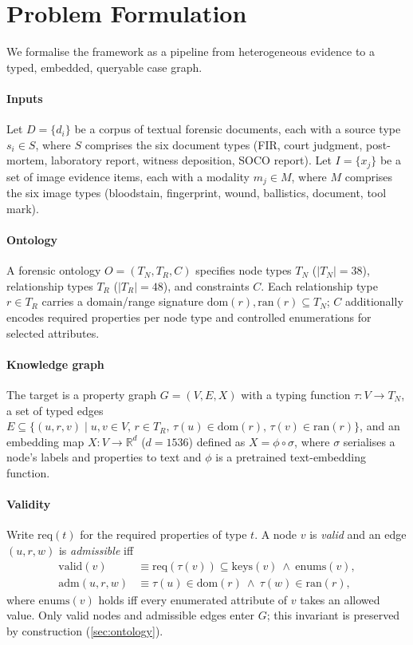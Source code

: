 \documentclass[conference]{IEEEtran}
\begin{document}
\section{Problem Formulation}
\label{sec:problem}

We formalise the framework as a pipeline from heterogeneous evidence to a typed,
embedded, queryable case graph.

\paragraph*{Inputs} Let $D=\{d_i\}$ be a corpus of textual forensic documents,
each with a source type $s_i \in S$, where $S$ comprises the six document types
(FIR, court judgment, post-mortem, laboratory report, witness deposition, SOCO
report). Let $I=\{x_j\}$ be a set of image evidence items, each with a modality
$m_j \in M$, where $M$ comprises the six image types (bloodstain, fingerprint,
wound, ballistics, document, tool mark).

\paragraph*{Ontology} A forensic ontology
$O=(T_N, T_R, C)$ specifies node types $T_N$ ($|T_N|=38$), relationship types
$T_R$ ($|T_R|=48$), and constraints $C$. Each relationship type $r\in T_R$
carries a domain/range signature $\mathrm{dom}(r),\mathrm{ran}(r)\subseteq T_N$;
$C$ additionally encodes required properties per node type and controlled
enumerations for selected attributes.

\paragraph*{Knowledge graph} The target is a property graph $G=(V,E,X)$ with a
typing function $\tau:V\to T_N$, a set of typed edges
$E\subseteq\{(u,r,v)\mid u,v\in V,\, r\in T_R,\, \tau(u)\in\mathrm{dom}(r),\,
\tau(v)\in\mathrm{ran}(r)\}$, and an embedding map $X:V\to\mathbb{R}^{d}$
($d=1536$) defined as $X=\phi\circ\sigma$, where $\sigma$ serialises a node's
labels and properties to text and $\phi$ is a pretrained text-embedding function.

\paragraph*{Validity} Write $\mathrm{req}(t)$ for the required properties of type
$t$. A node $v$ is \emph{valid} and an edge $(u,r,w)$ is \emph{admissible} iff
\begin{align}
\mathrm{valid}(v) &\equiv \mathrm{req}(\tau(v))\subseteq\mathrm{keys}(v)\ \wedge\ \mathrm{enums}(v),\label{eq:valid}\\
\mathrm{adm}(u,r,w) &\equiv \tau(u)\in\mathrm{dom}(r)\ \wedge\ \tau(w)\in\mathrm{ran}(r),\label{eq:adm}
\end{align}
where $\mathrm{enums}(v)$ holds iff every enumerated attribute of $v$ takes an
allowed value. Only valid nodes and admissible edges enter $G$; this invariant
is preserved by construction (\cref{sec:ontology}).
\end{document}
